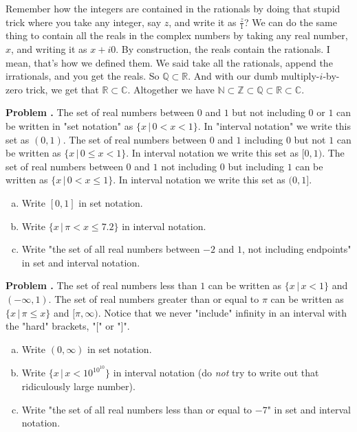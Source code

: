 \documentclass[11pt,letterpaper]{article}
\newcounter{problem}
\newcommand{\problem}{
	\stepcounter{problem}%
	\noindent \textbf{Problem \theproblem. }%
}
\begin{document}
\noindent Remember how the integers are contained in the rationals by doing that stupid trick where you take any integer, say $z$, and write it as $\frac{z}{1}$? We can do the same thing to contain all the reals in the complex numbers by taking any real number, $x$, and writing it as $x + i0$. By construction, the reals contain the rationals. I mean, that's how we defined them. We said take all the rationals, append the irrationals, and you get the reals. So $\mathbb{Q} \subset \mathbb{R}$. And with our dumb multiply-$i$-by-zero trick, we get that $\mathbb{R} \subset \mathbb{C}$. Altogether we have $\mathbb{N} \subset \mathbb{Z}  \subset \mathbb{Q} \subset \mathbb{R} \subset \mathbb{C}$.

\vspace{0.5cm}

\problem The set of real numbers between $0$ and $1$ but not including $0$ or $1$ can be written in "set notation" as $\{x \, | \, 0 < x < 1\}$. In "interval notation" we write this set as $(0,1)$. The set of real numbers between $0$ and $1$ including $0$ but not $1$ can be written as $\{x \, | \, 0 \le x < 1\}$. In interval notation we write this set as $[0,1)$. The set of real numbers between $0$ and $1$ not including $0$ but including $1$ can be written as $\{x \, | \, 0 < x \le 1\}$. In interval notation we write this set as $(0,1]$. \\
	\begin{enumerate}[(a)]
	\item Write $[0, 1]$ in set notation.
	\item Write $ \{ x \, | \, \pi < x \le 7.2 \}$ in interval notation.
	\item Write "the set of all real numbers between $-2$ and $1$, not including endpoints" in set and interval notation.
	\end{enumerate} 

\vspace{.5cm}



\problem The set of real numbers less than $1$ can be written as $ \{ x \, | \, x < 1 \}$ and $( -\infty, 1) $. The set of real numbers greater than or equal to $\pi$ can be written as $ \{ x \, | \, \pi \le x \}$ and $[ \pi, \infty)$. Notice that we never "include" infinity in an interval with the "hard" brackets, "$[$" or "$]$". \\
\begin{enumerate}[(a)]
	\item Write $(0, \infty)$ in set notation.
	\item Write $ \{ x \, | \, x < 10^{10^{10}} \}$ in interval notation (do \textit{not} try to write out that ridiculously large number).
	\item Write "the set of all real numbers less than or equal to $-7$" in set and interval notation.
\end{enumerate} 
\end{document}
